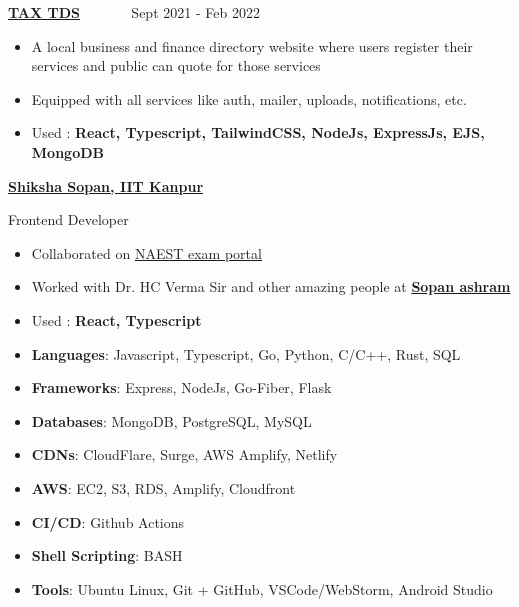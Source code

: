 \documentclass[10pt,a4paper,ragged2e,withhyper]{altacv}
\begin{document}
\begin{paracol}{2}
\divider

\large \textcolor{VividPurple}{\href{https://github.com/m3rashid/taxtds-new}{\textbf{TAX TDS}}} ~~~~~~ \normalsize \faCalendar Sept 2021 - Feb 2022
\begin{itemize}
  \item A local business and finance directory website where users register their services and public can quote for those services
  \item Equipped with all services like auth, mailer, uploads, notifications, etc.
  \item Used : \textcolor{VividPurple}{\textbf{React, Typescript, TailwindCSS, NodeJs, ExpressJs, EJS, MongoDB }}
\end{itemize}

\switchcolumn


\large \textcolor{VividPurple}{\href{https://shiksha-sopan.org}{\textbf{Shiksha Sopan, IIT Kanpur}}}

\large Frontend Developer

\begin{itemize}
  \item Collaborated on \href{https://naest.shiksha-sopan.org/}{\underline{NAEST exam portal}}
  \item Worked with Dr. HC Verma Sir and other amazing people at \href{https://www.iitk.ac.in/dora/shiksha-sopan}{\textbf{Sopan ashram}}
  \item Used : \textcolor{VividPurple}{\textbf{React, Typescript }} 
\end{itemize}

\begin{itemize}
    \item \textbf{Languages}:  Javascript, Typescript, Go, Python, C/C++, Rust, SQL
    \item \textbf{Frameworks}:  Express, NodeJs, Go-Fiber, Flask
    \item \textbf{Databases}:  MongoDB, PostgreSQL, MySQL
    \item \textbf{CDNs}:  CloudFlare, Surge, AWS Amplify, Netlify
    \item \textbf{AWS}:  EC2, S3, RDS, Amplify, Cloudfront
    \item \textbf{CI/CD}:  Github Actions
    \item \textbf{Shell Scripting}:  BASH
    \item \textbf{Tools}:  Ubuntu Linux, Git + GitHub, VSCode/WebStorm, Android Studio
\end{itemize}


\end{paracol}
\end{document}
